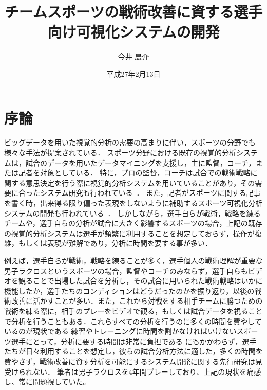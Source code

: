 \documentclass[sotsuron]{kuee}
\title{チームスポーツの戦術改善に資する選手向け可視化システムの開発}
\author{今井 晨介}
\date{平成27年2月13日}
\begin{document}
\maketitle	
\tableofcontents


\chapter{序論}
	ビッグデータを用いた視覚的分析の需要の高まりに伴い，スポーツの分野でも様々な手法が提案されている．
	スポーツ分野における既存の視覚的分析システムは，試合のデータを用いたデータマイニングを支援し，主に監督，コーチ，または記者を対象としている．
	特に，プロの監督，コーチは試合での戦術戦略に関する意思決定を行う際に視覚的分析システムを用いていることがあり，その需要に合ったシステム研究も行われている~\cite{SoccerStory,SnapShot,TenniVis}．
	また，記者がスポーツに関する記事を書く時，出来得る限り偏った表現をしないように補助するスポーツ可視化分析システムの開発も行われている~\cite{SoccerStory}．
	しかしながら，選手自らが戦術，戦略を練るチームや，選手自らの分析が試合に大きく影響するスポーツの場合，上記の既存の視覚的分析システムは選手が頻繁に利用することを想定しておらず，操作が複雑，もしくは表現が難解であり，分析に時間を要する事が多い．
	
	例えば，選手自らが戦術，戦略を練ることが多く，選手個人の戦術理解が重要な男子ラクロスというスポーツの場合，監督やコーチのみならず，選手自らもビデオを観ることで出場した試合を分析し，その試合に用いられた戦術戦略はいかに機能したか，選手たちのコンディションはどうだったのかを振り返り，以後の戦術改善に活かすことが多い．また，これから対戦をする相手チームに勝つための戦術を練る際に，相手のプレーをビデオで観る，もしくは試合データを視ることで分析を行うこともある．これらすべての分析を行うのに多くの時間を費やしているのが現状である
	練習やトレーニングに時間を割かなければいけないスポーツ選手にとって，分析に要する時間は非常に負担である
	にもかかわらず，選手たちが日々利用することを想定し，彼らの試合分析方法に適した，多くの時間を費やさず，戦術改善に資す分析を可能にするシステム開発に関する先行研究は見受けられない．
	筆者は男子ラクロスを4年間プレーしており、上記の現状を痛感し、常に問題視していた。
	
\end{document}
